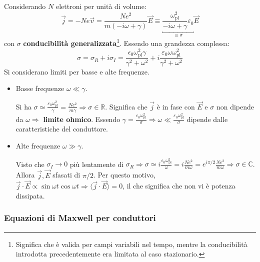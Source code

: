 \documentclass[a4paper]{scrartcl}
\numberwithin{equation}{subsection}
\theoremstyle{style1}
\begin{document}
Considerando $N$ elettroni per unit\`a di volume: 
\begin{equation}
	\vec{j}= - Ne \vec{v}= \frac{Ne^2}{m(-i\omega + \gamma)}\vec{E}\equiv \underbracket{\frac{\omega_\text{pl}^2}{-i\omega + \gamma}\varepsilon _0}_{\equiv \sigma }  \vec{E}
\end{equation}
con $\sigma $ \textbf{conducibilit\`a generalizzata}\footnote{Significa che \`e valida per campi variabili nel tempo, mentre la conducibilit\`a introdotta precedentemente era limitata al caso stazionario.}. Essendo una grandezza complessa:
\begin{equation}
	\sigma = \sigma _R + i \sigma _I = \frac{\epsilon _0 \omega_\text{pl}^2 \gamma}{\gamma^2 + \omega^2} + i \frac{\varepsilon _0 \omega \omega_\text{pl}^2}{\gamma^2 + \omega^2}
\end{equation}
Si considerano limiti per basse e alte frequenze.
\begin{itemize}
	\item Basse frequenze $\omega \ll \gamma$.

Si ha $ \sigma \simeq \frac{\varepsilon _0 \omega_\text{pl}^2}{\gamma} = \frac{Ne^2 }{m\gamma}\Rightarrow \sigma \in \mathbb{R}$. Significa che $\vec{j}$ \`e in fase con $\vec{E}$ e $\sigma $ non dipende da $\omega\Rightarrow $ \textbf{limite ohmico}. Essendo $\gamma=\frac{\varepsilon _0 \omega_\text{pl}^2}{\sigma }\Rightarrow \omega \ll \frac{\varepsilon _0 \omega_\text{pl}^2}{\sigma } $ dipende dalle caratteristiche del conduttore.

\item Alte frequenze $\omega \gg \gamma$.

	Visto che $\sigma _I \to 0 $ pi\`u lentamente di $\sigma _R\Rightarrow \sigma \simeq i \frac{\varepsilon _0 \omega_\text{pl}^2 }{\omega}=i \frac{Ne^2}{m\omega}= e^{i \pi / 2} \frac{Ne^2}{m\omega}\Rightarrow \sigma \in \mathbb{C}$. Allora $\vec{j}, \vec{E}$ sfasati di $\pi / 2$. Per questo motivo, $\vec{j}\cdot \vec{E}\propto \sin\omega t \cos\omega t \Rightarrow \langle \vec{j}\cdot \vec{E} \rangle=0$, il che significa che non vi \`e potenza dissipata.
\end{itemize}

\subsubsection{Equazioni di Maxwell per conduttori}
\end{document}
